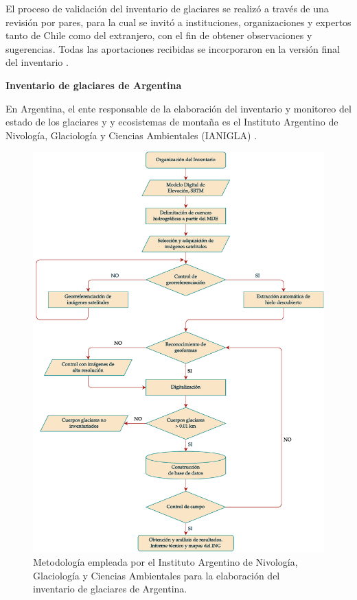 El proceso de validación del inventario de glaciares se realizó a través de una revisión por pares, para la cual se invitó a instituciones, organizaciones y expertos tanto de Chile como del extranjero, con el fin de obtener observaciones y sugerencias. Todas las aportaciones recibidas se incorporaron en la versión final del inventario \cite{DGA2022}.

\textbf{Inventario de glaciares de Argentina}


En Argentina, el ente responsable de la elaboración del inventario y monitoreo del estado de los glaciares y y ecosistemas de montaña es el Instituto Argentino de Nivología, Glaciología y Ciencias Ambientales (IANIGLA) \cite{rojas2020inventario}.

\begin{figure}[H]
    \begin{center}
    \includegraphics[width=1\textwidth]{Images/MetodologiaIanigla.pdf}
    \end{center}
    \caption{Metodología empleada por el Instituto Argentino de Nivología, Glaciología y Ciencias Ambientales para la elaboración del inventario de glaciares de Argentina.}
    \label{fig:MetodologiaIanigla}
\end{figure}

 